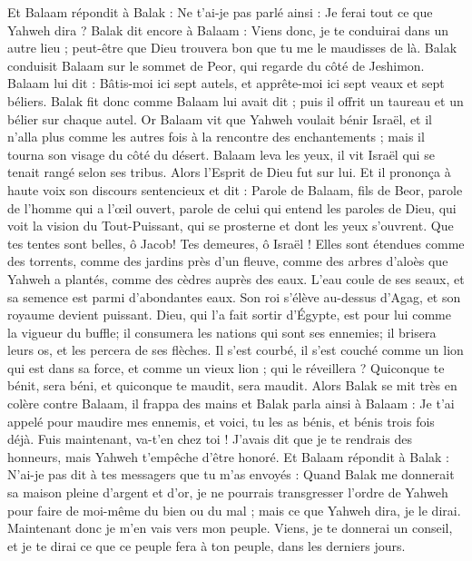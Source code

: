 \begin{multicols}{2}
Et Balaam répondit à Balak : Ne t'ai-je pas parlé ainsi : Je ferai tout ce que Yahweh dira ?
Balak dit encore à Balaam : Viens donc, je te conduirai dans un autre lieu ; peut-être que Dieu trouvera bon que tu me le maudisses de là.
Balak conduisit Balaam sur le sommet de Peor, qui regarde du côté de Jeshimon.
Balaam lui dit : Bâtis-moi ici sept autels, et apprête-moi ici sept veaux et sept béliers.
Balak fit donc comme Balaam lui avait dit ; puis il offrit un taureau et un bélier sur chaque autel.
\VerseOne{}Or Balaam vit que Yahweh voulait bénir Israël, et il n'alla plus comme les autres fois à la rencontre des enchantements ; mais il tourna son visage du côté du désert.
Balaam leva les yeux, il vit Israël qui se tenait rangé selon ses tribus. Alors l'Esprit de Dieu fut sur lui.
Et il prononça à haute voix son discours sentencieux et dit : Parole de Balaam, fils de Beor, parole de l'homme qui a l'œil ouvert,
parole de celui qui entend les paroles de Dieu, qui voit la vision du Tout-Puissant, qui se prosterne et dont les yeux s'ouvrent.
Que tes tentes sont belles, ô Jacob! Tes demeures, ô Israël !
Elles sont étendues comme des torrents, comme des jardins près d'un fleuve, comme des arbres d'aloès que Yahweh a plantés, comme des cèdres auprès des eaux.
L'eau coule de ses seaux, et sa semence est parmi d'abondantes eaux. Son roi s'élève au-dessus d'Agag, et son royaume devient puissant.
Dieu, qui l'a fait sortir d'Égypte, est pour lui comme la vigueur du buffle; il consumera les nations qui sont ses ennemies; il brisera leurs os, et les percera de ses flèches.
Il s'est courbé, il s'est couché comme un lion qui est dans sa force, et comme un vieux lion ; qui le réveillera ? Quiconque te bénit, sera béni, et quiconque te maudit, sera maudit.
Alors Balak se mit très en colère contre Balaam, il frappa des mains et Balak parla ainsi à Balaam : Je t’ai appelé pour maudire mes ennemis, et voici, tu les as bénis, et bénis trois fois déjà.
Fuis maintenant, va-t'en chez toi ! J'avais dit que je te rendrais des honneurs, mais Yahweh t'empêche d’être honoré.
Et Balaam répondit à Balak : N'ai-je pas dit à tes messagers que tu m'as envoyés :
Quand Balak me donnerait sa maison pleine d'argent et d'or, je ne pourrais transgresser l'ordre de Yahweh pour faire de moi-même du bien ou du mal ; mais ce que Yahweh dira, je le dirai.
Maintenant donc je m'en vais vers mon peuple. Viens, je te donnerai un conseil, et je te dirai ce que ce peuple fera à ton peuple, dans les derniers jours.

\end{multicols}
